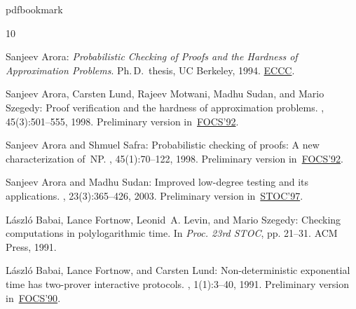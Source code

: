 \documentclass[11pt]{article}
\numberwithin{equation}{section}
\theoremstyle{definition}
\theoremstyle{plain}
\theoremstyle{plain}
\begin{document}
\newcommand{\prelim}{Preliminary version in\ }
\providecommand{\bibhead}[1]{}
\expandafter\ifx\csname pdfbookmark\endcsname\relax%
  \providecommand{\tocrefpdfbookmark}{}
\else\providecommand{\tocrefpdfbookmark}{%
   \hypertarget{tocreferences}{}%
   \pdfbookmark[1]{References}{tocreferences}}%
\fi

\tocrefpdfbookmark
\begin{thebibliography}{10}

\bibhead{Arora1994}
{\sc Sanjeev Arora}: {\em Probabilistic Checking of Proofs and the Hardness of
  Approximation Problems}.
\newblock Ph.\,D.\ thesis, UC Berkeley, 1994.
\newblock
  \href{https://eccc.weizmann.ac.il/static/books/Probabilistic_Checking_of_Proofs_and_Hardness_of_Approximation_Problems/}{ECCC}.

\bibhead{AroraLMSS1998}
{\sc Sanjeev Arora, Carsten Lund, Rajeev Motwani, Madhu Sudan, and Mario
  Szegedy}: Proof verification and the hardness of approximation problems.
, 45(3):501--555, 1998.
\newblock \prelim \href{https://doi.org/10.1109/SFCS.1992.267823}{FOCS'92}.

\bibhead{AroraS1998}
{\sc Sanjeev Arora and Shmuel Safra}: Probabilistic checking of proofs: A new
  characterization of~{NP}.
, 45(1):70--122, 1998.
\newblock \prelim \href{https://doi.org/10.1109/SFCS.1992.267824}{FOCS'92}.
\newblock [\epfmtdoi{10.1145/273865.273901}]

\bibhead{AroraS2003}
{\sc Sanjeev Arora and Madhu Sudan}: Improved low-degree testing and its
  applications.
, 23(3):365--426, 2003.
\newblock \prelim \href{https://doi.org/10.1145/258533.258642}{STOC'97}.

\bibhead{BabaiFLS1991}
{\sc L{\'a}szl{\'o} Babai, Lance Fortnow, Leonid~A. Levin, and Mario Szegedy}:
  Checking computations in polylogarithmic time.
\newblock In {\em Proc. 23rd STOC}, pp. 21--31. ACM Press, 1991.
\newblock [\epfmtdoi{10.1145/103418.103428}]

\bibhead{BabaiFL1991}
{\sc L{\'a}szl{\'o} Babai, Lance Fortnow, and Carsten Lund}: Non-deterministic
  exponential time has two-prover interactive protocols.
, 1(1):3--40, 1991.
\newblock \prelim \href{https://doi.org/10.1109/FSCS.1990.89520}{FOCS'90}.
\newblock [\epfmtdoi{10.1007/BF01200056}]


\end{thebibliography}
\end{document}
